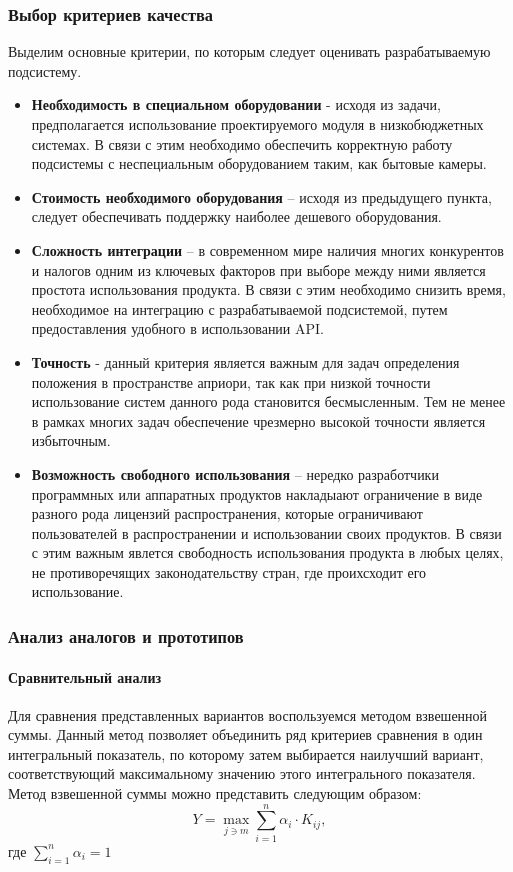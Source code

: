 \subsubsection{Выбор критериев качества}
Выделим основные критерии, по которым следует оценивать разрабатываемую подсистему.
\begin{itemize}
\item \textbf{Необходимость в специальном оборудовании} - исходя из задачи, предполагается использование проектируемого модуля в низкобюджетных системах. В связи с этим необходимо обеспечить корректную работу подсистемы с неспециальным оборудованием таким, как бытовые камеры. 
\item \textbf{Стоимость необходимого оборудования} – исходя из предыдущего пункта, следует обеспечивать поддержку наиболее дешевого оборудования. 
\item \textbf{Сложность интеграции} – в современном мире наличия многих конкурентов и налогов одним из ключевых факторов при выборе между ними является простота использования продукта. В связи с этим необходимо снизить время, необходимое на интеграцию с разрабатываемой подсистемой, путем предоставления удобного в использовании API.
\item \textbf{Точность} - данный критерия является важным для задач определения положения в пространстве априори, так как при низкой точности использование систем данного рода становится бесмысленным. Тем не менее в рамках многих задач обеспечение чрезмерно высокой точности является избыточным.
\item \textbf{Возможность свободного использования} – нередко разработчики программных или аппаратных продуктов накладыают ограничение в виде разного рода лицензий распространения, которые ограничивают пользователей в распространении и использовании своих продуктов. В связи с этим важным явлется свободность использования продукта в любых целях, не  противоречящих законодательству стран, где проихсходит его использование.
\end{itemize}

\subsubsection{Анализ аналогов и прототипов}


\paragraph{Сравнительный анализ}

Для сравнения представленных вариантов воспользуемся методом взвешенной суммы. Данный метод позволяет объединить ряд критериев сравнения в один интегральный показатель, по которому затем выбирается наилучший вариант, соответствующий максимальному значению этого интегрального показателя. Метод взвешенной суммы можно представить следующим образом: 
$$ Y = \max_{j \ni m} \displaystyle\sum_{i=1}^{n} \alpha_i \cdot K_{ij},$$
где $\sum_{i=1}^{n} \alpha_i = 1$


